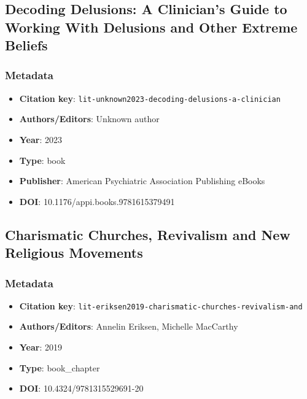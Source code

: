 \subsection{Decoding Delusions: A Clinician's Guide to Working With Delusions and Other Extreme Beliefs}\label{lit:lit-unknown2023-decoding-delusions-a-clinician}
\subsubsection*{Metadata}
\begin{itemize}
  \item \textbf{Citation key}: \texttt{lit-unknown2023-decoding-delusions-a-clinician}
  \item \textbf{Authors/Editors}: Unknown author
  \item \textbf{Year}: 2023
  \item \textbf{Type}: book
  \item \textbf{Publisher}: American Psychiatric Association Publishing eBooks
  \item \textbf{DOI}: 10.1176/appi.books.9781615379491
\end{itemize}

\subsection{Charismatic Churches, Revivalism and New Religious Movements}\label{lit:lit-eriksen2019-charismatic-churches-revivalism-and}
\subsubsection*{Metadata}
\begin{itemize}
  \item \textbf{Citation key}: \texttt{lit-eriksen2019-charismatic-churches-revivalism-and}
  \item \textbf{Authors/Editors}: Annelin Eriksen, Michelle MacCarthy
  \item \textbf{Year}: 2019
  \item \textbf{Type}: book\_chapter
  \item \textbf{DOI}: 10.4324/9781315529691-20
\end{itemize}
